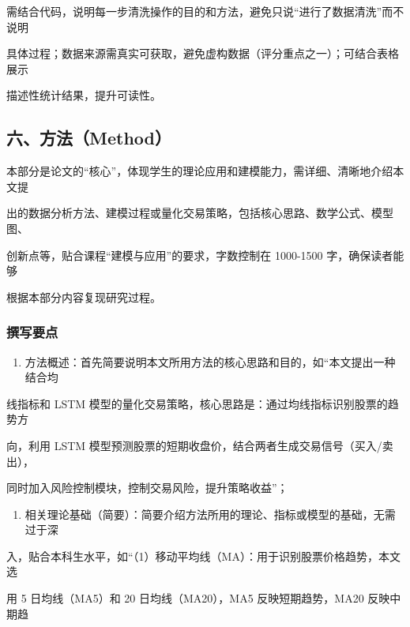 \documentclass[
]{article}
\providecommand{\tightlist}{%
  \setlength{\itemsep}{0pt}\setlength{\parskip}{0pt}}
\begin{document}
需结合代码，说明每一步清洗操作的目的和方法，避免只说``进行了数据清洗''而不说明

具体过程；数据来源需真实可获取，避免虚构数据（评分重点之一）；可结合表格展示

描述性统计结果，提升可读性。

\hypertarget{ux516dux65b9ux6cd5method}{%
\subsection{\texorpdfstring{\textbf{六、方法（Method）}}{六、方法（Method）}}\label{ux516dux65b9ux6cd5method}}

本部分是论文的``核心''，体现学生的理论应用和建模能力，需详细、清晰地介绍本文提

出的数据分析方法、建模过程或量化交易策略，包括核心思路、数学公式、模型图、

创新点等，贴合课程``建模与应用''的要求，字数控制在 1000-1500
字，确保读者能够

根据本部分内容复现研究过程。

\hypertarget{ux64b0ux5199ux8981ux70b9-1}{%
\subsubsection{\texorpdfstring{\textbf{撰写要点}}{撰写要点}}\label{ux64b0ux5199ux8981ux70b9-1}}

\begin{enumerate}
\def\labelenumi{\arabic{enumi}.}
\tightlist
\item
  方法概述：首先简要说明本文所用方法的核心思路和目的，如``本文提出一种结合均
\end{enumerate}

线指标和 LSTM
模型的量化交易策略，核心思路是：通过均线指标识别股票的趋势方

向，利用 LSTM
模型预测股票的短期收盘价，结合两者生成交易信号（买入/卖出），

同时加入风险控制模块，控制交易风险，提升策略收益''；

\begin{enumerate}
\def\labelenumi{\arabic{enumi}.}
\setcounter{enumi}{1}
\tightlist
\item
  相关理论基础（简要）：简要介绍方法所用的理论、指标或模型的基础，无需过于深
\end{enumerate}

入，贴合本科生水平，如``（1）移动平均线（MA）：用于识别股票价格趋势，本文选

用 5 日均线（MA5）和 20 日均线（MA20），MA5 反映短期趋势，MA20
反映中期趋
\end{document}
